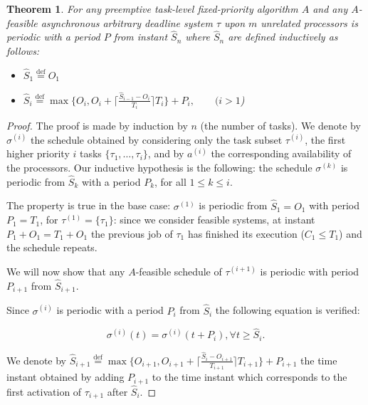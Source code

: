 \documentclass[a4paper,11pt]{article}
\newtheorem{Theorem}{Theorem}
\newcommand{\equals}{\stackrel{\mathrm{def}}{=}}
\begin{document}
\begin{Theorem} \label{asynPerbis} For any preemptive task-level fixed-priority
  algorithm $A$ and any $A$-feasible asynchronous arbitrary deadline system $\tau$
  upon $m$ unrelated processors is periodic with a period $P$ from instant $\widehat{S}_n$ where $\widehat{S}_n$
  are defined inductively as follows: 

  \begin{itemize}
  \item $\widehat{S}_1 \equals O_1$
  \item $\widehat{S}_i \equals \max \{ O_i, O_i+ \lceil
    \frac{\widehat{S}_{i-1}-O_i}{T_i} \rceil T_i \} + P_i, \qquad (i >
    1$)
   \end{itemize}
\end{Theorem}

\begin{proof}
  The proof is made by induction by $n$ (the number of tasks). We
  denote by $\sigma^{(i)}$ the schedule obtained by considering only
  the task subset $\tau^{(i)}$, the first higher priority $i$ tasks
  $\{\tau_1, \ldots, \tau_i \}$, and by $a^{(i)}$ the corresponding
  availability of the processors. Our inductive hypothesis is the
  following: the schedule $\sigma^{(k)}$ is periodic from $\widehat{S}_k$
  with a period $P_k$, for all $1 \leq k \leq i$.

  The property is true in the base case: $\sigma^{(1)}$ is periodic
  from $\widehat{S}_1=O_1$ with period $P_1=T_{1}$, for $\tau^{(1)}= \{\tau_1 \}$:
  since we consider feasible systems, at instant $P_1+O_1=T_1+O_1$ the
  previous job of $\tau_1$ has finished its execution ($C_1 \leq
  T_1$) and the schedule repeats.

  We will now show that any $A$-feasible schedule of $\tau^{(i+1)}$
  is periodic with period $P_{i+1}$ from $\widehat{S}_{i+1}$.

  Since $\sigma^{(i)}$ is periodic with a period $P_{i}$ from $\widehat{S}_{i}$ the
  following equation is verified:

\begin{equation}
  \label{stateInterbis}
\sigma^{(i)}(t)=\sigma^{(i)}(t+P_i), \forall t \geq \widehat{S}_{i}.
\end{equation}

We denote by $\widehat{S}_{i+1} \equals \max \{ O_{i+1}, O_{i+1}+ \lceil
\frac{\widehat{S}_{i}-O_{i+1}}{T_{i+1}} \rceil T_{i+1} \} +P_{i+1}$ the time
instant obtained by adding $P_{i+1}$ to the time instant which
corresponds to the first activation of $\tau_{i+1}$ after $\widehat{S}_i$.


\end{proof}
\end{document}
